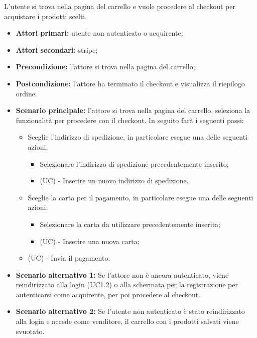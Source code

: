 L'utente si trova nella pagina del carrello e vuole procedere al checkout per acquistare i prodotti scelti.
\begin{itemize}
    \item \textbf{Attori primari:} utente non autenticato o acquirente;
    \item \textbf{Attori secondari:} stripe;
    \item \textbf{Precondizione:} l'attore si trova nella pagina del carrello;
    \item \textbf{Postcondizione:} l'attore ha terminato il checkout e visualizza il riepilogo ordine.
    \item \textbf{Scenario principale:} l'attore si trova nella pagina del carrello, seleziona la funzionalità per procedere con il checkout. In seguito farà i seguenti passi:
    \begin{itemize}
    	\item Sceglie l'indirizzo di spedizione, in particolare esegue una delle seguenti azioni: 
    	\begin{itemize}
    		\item Selezionare l'indirizzo di spedizione precedentemente inserito;
    		\item (UC) - Inserire un nuovo indirizzo di spedizione.
    	\end{itemize}
    	\item Sceglie la carta per il pagamento, in particolare esegue una delle seguenti azioni: 
    	\begin{itemize}
    		\item Selezionare la carta da utilizzare precedentemente inserita;
    		\item (UC) - Inserire una nuova carta;
    	\end{itemize}
        \item (UC) - Invia il pagamento.
    \end{itemize}
    \item \textbf{Scenario alternativo 1:} Se l'attore non è ancora autenticato, viene reindirizzato alla login (UC1.2) o alla schermata per la registrazione per autenticarsi come acquirente, per poi procedere al checkout.
    \item \textbf{Scenario alternativo 2:} Se l'utente non autenticato è stato reindirizzato alla login e accede come venditore, il carrello con i prodotti salvati viene svuotato.
\end{itemize}

\resetSubUC

